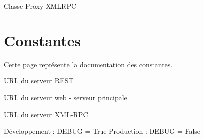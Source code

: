 \documentclass[letterpaper,10pt,french]{sphinxmanual}
\begin{document}

\begin{fulllineitems}
\label{proxy:proxy.ProxyXMLRPC}
Classe Proxy XMLRPC

\end{fulllineitems}



\chapter{Constantes}
\label{constantes::doc}\label{constantes:constantes}
Cette page représente la documentation des constantes.
\label{constantes:module-constantes}

\begin{fulllineitems}
\label{constantes:constantes.ADR_REST}
URL du serveur REST

\end{fulllineitems}


\begin{fulllineitems}
\label{constantes:constantes.ADR_WEB}
URL du serveur web - serveur principale

\end{fulllineitems}


\begin{fulllineitems}
\label{constantes:constantes.ADR_XMLRPC}
URL du serveur XML-RPC

\end{fulllineitems}


\begin{fulllineitems}
\label{constantes:constantes.DEBUG}
Développement : DEBUG = True
Production : DEBUG = False

\end{fulllineitems}
\end{document}
